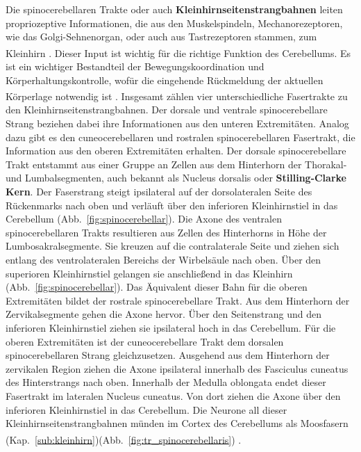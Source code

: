 Die spinocerebellaren Trakte oder auch \textbf{Kleinhirnseitenstrangbahnen} leiten propriozeptive Informationen, die aus den Muskelspindeln, Mechanorezeptoren, wie das Golgi-Sehnenorgan, oder auch aus Tastrezeptoren stammen, zum Kleinhirn \textsuperscript{\cite[Kap.~8]{crossman2014neuroanatomy}}. Dieser Input ist wichtig für die richtige Funktion des Cerebellums. Es ist ein wichtiger Bestandteil der Bewegungskoordination und Körperhaltungskontrolle, wofür die eingehende Rückmeldung der aktuellen Körperlage notwendig ist \textsuperscript{\cite[3]{trepel2011neuroanatomie}}. Insgesamt zählen vier unterschiedliche Fasertrakte zu den Kleinhirnseitenstrangbahnen. Der dorsale und ventrale spinocerebellare Strang beziehen dabei ihre Informationen aus den unteren Extremitäten. Analog dazu gibt es den cuneocerebellaren und rostralen spinocerebellaren Fasertrakt, die Information aus den oberen Extremitäten erhalten. Der dorsale spinocerebellare Trakt entstammt aus einer Gruppe an Zellen aus dem Hinterhorn der Thorakal- und Lumbalsegmenten, auch bekannt als Nucleus dorsalis oder \textbf{Stilling-Clarke Kern}. Der Faserstrang steigt ipsilateral auf der dorsolateralen Seite des Rückenmarks nach oben und verläuft über den inferioren Kleinhirnstiel in das Cerebellum (Abb.~\ref{fig:spinocerebellar}). Die Axone des ventralen spinocerebellaren Trakts resultieren aus Zellen des Hinterhorns in Höhe der Lumbosakralsegmente. Sie kreuzen auf die contralaterale Seite und ziehen sich entlang des ventrolateralen Bereichs der Wirbelsäule nach oben. Über den superioren Kleinhirnstiel gelangen sie anschließend in das Kleinhirn (Abb.~\ref{fig:spinocerebellar}). Das Äquivalent dieser Bahn für die oberen Extremitäten bildet der rostrale spinocerebellare Trakt. Aus dem Hinterhorn der Zervikalsegmente gehen die Axone hervor. Über den Seitenstrang und den inferioren Kleinhirnstiel ziehen sie ipsilateral hoch in das Cerebellum. Für die oberen Extremitäten ist der cuneocerebellare Trakt dem dorsalen spinocerebellaren Strang gleichzusetzen. Ausgehend aus dem Hinterhorn der zervikalen Region ziehen die Axone ipsilateral innerhalb des Fasciculus cuneatus des Hinterstrangs nach oben. Innerhalb der Medulla oblongata endet dieser Fasertrakt im lateralen Nucleus cuneatus. Von dort ziehen die Axone über den inferioren Kleinhirnstiel in das Cerebellum. Die Neurone all dieser Kleinhirnseitenstrangbahnen münden im Cortex des Cerebellums als Moosfasern (Kap.~\ref{sub:kleinhirn})(Abb.~\ref{fig:tr_spinocerebellaris}) \textsuperscript{\cite[8]{crossman2014neuroanatomy}}.          

